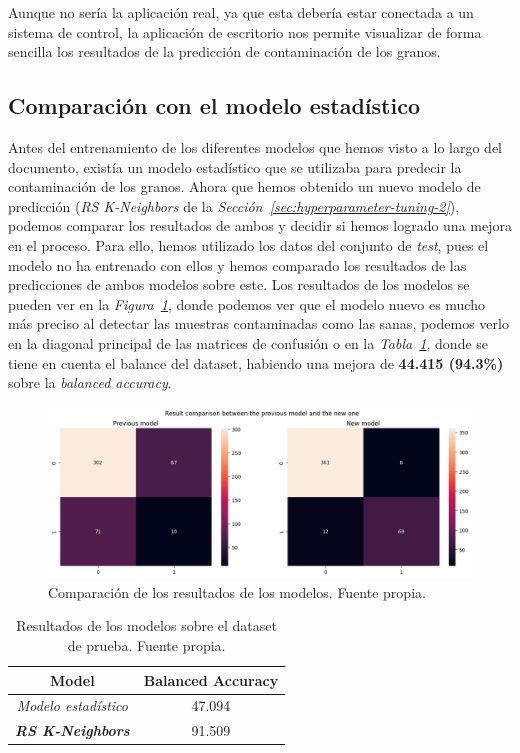 Aunque no sería la aplicación real, ya que esta debería estar conectada a un sistema de control, la aplicación de escritorio nos permite visualizar de forma sencilla los resultados de la predicción de contaminación de los granos.

\subsection{Comparación con el modelo estadístico}

Antes del entrenamiento de los diferentes modelos que hemos visto a lo largo del documento, existía un modelo estadístico que se utilizaba para predecir la contaminación de los granos. Ahora que hemos obtenido un nuevo modelo de predicción (\textit{RS K-Neighbors} de la \textit{Sección\ \ref{sec:hyperparameter-tuning-2}}), podemos comparar los resultados de ambos y decidir si hemos logrado una mejora en el proceso.
Para ello, hemos utilizado los datos del conjunto de \textit{test}, pues el modelo no ha entrenado con ellos y hemos comparado los resultados de las predicciones de ambos modelos sobre este. Los resultados de los modelos se pueden ver en la \textit{Figura\ \ref{fig:model-comparison}}, donde podemos ver que el modelo nuevo es mucho más preciso al detectar las muestras contaminadas como las sanas, podemos verlo en la diagonal principal de las matrices de confusión o en la \textit{Tabla\ \ref{tab:model-comparison-tab}}, donde se tiene en cuenta el balance del \gls{dataset}, habiendo una mejora de \textbf{44.415 (94.3\%)} sobre la \textit{balanced accuracy}.

\begin{figure}
    \centering
    \includegraphics[width=\textwidth]{media/images/model-comparison.png}
    \caption{Comparación de los resultados de los modelos. Fuente propia.}
    \label{fig:model-comparison}
\end{figure}

\begin{table}
    \centering
    \begin{tabular}{|c|c|}
        \hline
        \textbf{Model} & \textbf{Balanced Accuracy} \\ \hline
        \textit{Modelo estadístico} & 47.094 \\ 
        \textit{\textbf{RS K-Neighbors}} & 91.509 \\ \hline
    \end{tabular}
    \caption{Resultados de los modelos sobre el dataset de prueba. Fuente propia.}\ \label{tab:model-comparison-tab}
\end{table}